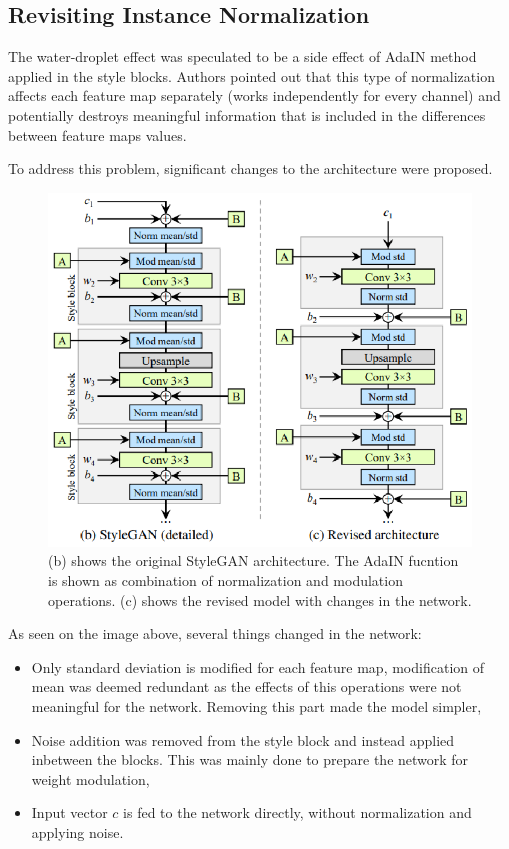\documentclass[12pt,a4paper,openany]{book}
\begin{document}
\subsection{Revisiting Instance Normalization}

The water-droplet effect was speculated to be a side effect of AdaIN method applied in the style blocks. Authors pointed out that this type of normalization affects each feature map separately (works independently for every channel) and potentially destroys meaningful information that is included in the differences between feature maps values.

To address this problem, significant changes to the architecture were proposed.

\begin{figure}[ht!]
    \centering
    \includegraphics[scale=1.3]{figs/changed-normalization.eps}
    \caption{(b) shows the original StyleGAN architecture. The AdaIN fucntion is shown as combination of normalization and modulation operations. (c) shows the revised model with changes in the network.}\label{Fig:STYLEGAN}
\end{figure}

As seen on the image above, several things changed in the network:

\begin{itemize}
\item Only standard deviation is modified for each feature map, modification of mean was deemed redundant as the effects of this operations were not meaningful for the network. Removing this part made the model simpler,
\item Noise addition was removed from the style block and instead applied inbetween the blocks. This was mainly done to prepare the network for weight modulation,
\item Input vector $c$ is fed to the network directly, without normalization and applying noise.
\end{itemize}
\end{document}
